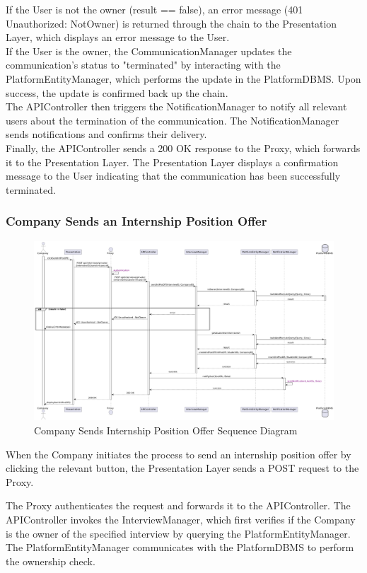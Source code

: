 If the User is not the owner (result == false), an error message (401 Unauthorized: NotOwner) is returned through the chain to the Presentation Layer, which displays an error message to the User.\\
If the User is the owner, the CommunicationManager updates the communication's status to "terminated" by interacting with the PlatformEntityManager, which performs the update in the PlatformDBMS. Upon success, the update is confirmed back up the chain.\\
The APIController then triggers the NotificationManager to notify all relevant users about the termination of the communication. The NotificationManager sends notifications and confirms their delivery.\\
Finally, the APIController sends a 200 OK response to the Proxy, which forwards it to the Presentation Layer. The Presentation Layer displays a confirmation message to the User indicating that the communication has been successfully terminated.
\subsubsection*{Company Sends an Internship Position Offer}
\begin{figure}[H]
    \centering
    \includegraphics[width=\linewidth]{Latex/Images/DD/SequenceDiagrams/21CompanySendsIntPosOff.png}
    \caption{Company Sends Internship Position Offer Sequence Diagram}
    \label{fig:compsendintposoff}
\end{figure}
When the Company initiates the process to send an internship position offer by clicking the relevant button, the Presentation Layer sends a POST request to the Proxy.

The Proxy authenticates the request and forwards it to the APIController. The APIController invokes the InterviewManager, which first verifies if the Company is the owner of the specified interview by querying the PlatformEntityManager. The PlatformEntityManager communicates with the PlatformDBMS to perform the ownership check.

